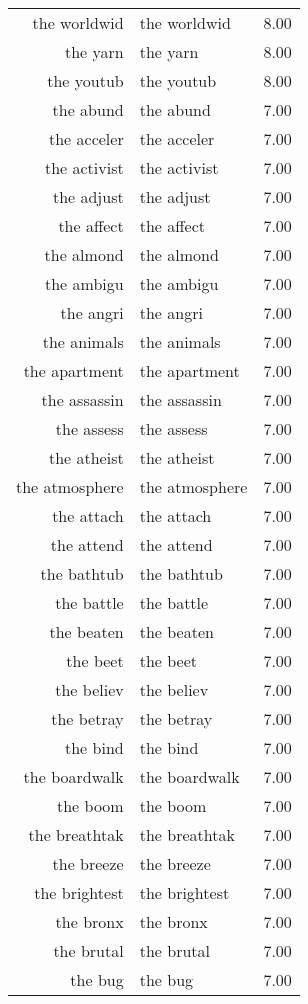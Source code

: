 \begin{table}[ht]
\begin{tabular}{rlr}
  the worldwid & the worldwid & 8.00 \\ 
  the yarn & the yarn & 8.00 \\ 
  the youtub & the youtub & 8.00 \\ 
  the abund & the abund & 7.00 \\ 
  the acceler & the acceler & 7.00 \\ 
  the activist & the activist & 7.00 \\ 
  the adjust & the adjust & 7.00 \\ 
  the affect & the affect & 7.00 \\ 
  the almond & the almond & 7.00 \\ 
  the ambigu & the ambigu & 7.00 \\ 
  the angri & the angri & 7.00 \\ 
  the animals & the animals & 7.00 \\ 
  the apartment & the apartment & 7.00 \\ 
  the assassin & the assassin & 7.00 \\ 
  the assess & the assess & 7.00 \\ 
  the atheist & the atheist & 7.00 \\ 
  the atmosphere & the atmosphere & 7.00 \\ 
  the attach & the attach & 7.00 \\ 
  the attend & the attend & 7.00 \\ 
  the bathtub & the bathtub & 7.00 \\ 
  the battle & the battle & 7.00 \\ 
  the beaten & the beaten & 7.00 \\ 
  the beet & the beet & 7.00 \\ 
  the believ & the believ & 7.00 \\ 
  the betray & the betray & 7.00 \\ 
  the bind & the bind & 7.00 \\ 
  the boardwalk & the boardwalk & 7.00 \\ 
  the boom & the boom & 7.00 \\ 
  the breathtak & the breathtak & 7.00 \\ 
  the breeze & the breeze & 7.00 \\ 
  the brightest & the brightest & 7.00 \\ 
  the bronx & the bronx & 7.00 \\ 
  the brutal & the brutal & 7.00 \\ 
  the bug & the bug & 7.00 \\ 

\end{tabular}
\end{table}
